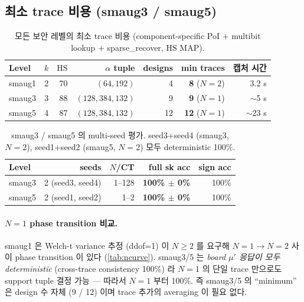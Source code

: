 \documentclass[11pt]{article}
\theoremstyle{plain}
\theoremstyle{definition}
\theoremstyle{remark}
\newcommand{\HS}{\mathrm{HS}}
\begin{document}
\subsection{최소 trace 비용 (smaug3 / smaug5)}
\label{sec:ext-result}

\begin{table}[h!]
\centering
\caption{모든 보안 레벨의 최소 trace 비용 (component-specific PoI +
multibit lookup + sparse\_recover, $\HS$ MAP).}
\label{tab:level-summary}
\small
\begin{tabular}{lrrrrrr}
\toprule
Level & $k$ & $\HS$ & $\alpha$ tuple & designs & \textbf{min traces} & 캡처 시간 \\
\midrule
smaug1 & 2 & 70 & $(64, 192)$ & 4 & \textbf{8} ($N=2$) & 3.2 s \\
smaug3 & 3 & 88 & $(128, 384, 132)$ & 9 & \textbf{9} ($N=1$) & $\sim$5 s \\
smaug5 & 4 & 87 & $(128, 384, 132)$ & 12 & \textbf{12} ($N=1$) & $\sim$23 s \\
\bottomrule
\end{tabular}
\end{table}

\begin{table}[h!]
\centering
\caption{smaug3 / smaug5 의 multi-seed 평가. seed3+seed4 (smaug3, $N=2$),
seed1+seed2 (smaug5, $N=2$) 모두 deterministic 100\%.}
\label{tab:ext-multiseed}
\small
\begin{tabular}{lrrrr}
\toprule
Level & seeds & $N$/CT & full sk acc & sign acc \\
\midrule
smaug3 & 2 (seed3, seed4) & 1--128 & \textbf{100\% $\pm$ 0\%} & 100\% \\
smaug5 & 2 (seed1, seed2) & 1--2  & \textbf{100\% $\pm$ 0\%} & 100\% \\
\bottomrule
\end{tabular}
\end{table}

\paragraph{$N=1$ phase transition 비교.} smaug1 은 Welch-t variance 추정
(ddof=1) 이 $N \geq 2$ 를 요구해 $N=1 \to N=2$ 사이 phase transition
이 있다 (\cref{tab:ncurve}). smaug3/5 는 \emph{board $\mu'$ 응답이 모두
deterministic} (cross-trace consistency 100\%) 라 $N=1$ 의 단일 trace 만으로도
support tuple 결정 가능 — 따라서 $N=1$ 부터 100\%. 즉 smaug3/5 의 ``minimum''
은 design 수 자체 (9 / 12) 이며 trace 추가의 averaging 이 필요 없다.
\end{document}
